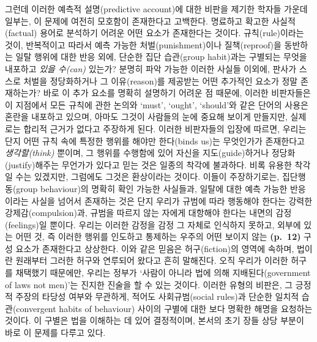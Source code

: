 \documentclass[12pt, oneside]{book}  %
\begin{document}
그런데 이러한 예측적 설명(predictive account)에 대한 비판을 제기한
학자들 가운데 일부는, 이 문제에 여전히 모호함이 존재한다고 고백한다.
명료하고 확고한 사실적(factual) 용어로 분석하기 어려운 어떤 요소가
존재한다는 것이다. 규칙(rule)이라는 것이, 반복적이고 따라서 예측 가능한
처벌(punishment)이나 질책(reproof)을 동반하는 일탈 행위에 대한 반응
외에, 단순한 집단 습관(group habit)과는 구별되는 무엇을 내포하고
\emph{있을 수(can)} 있는가? 분명히 파악 가능한 이러한 사실들 이외에,
판사가 스스로 처벌을 정당화하거나 그 이유(reason)를 제공받는 어떤
추가적인 요소가 정말 존재하는가? 바로 이 추가 요소를 명확히 설명하기
어려운 점 때문에, 이러한 비판자들은 이 지점에서 모든 규칙에 관한 논의와
`must', `ought', `should'와 같은 단어의 사용은 혼란을 내포하고 있으며,
아마도 그것이 사람들의 눈에 중요해 보이게 만들지만, 실제로는 합리적
근거가 없다고 주장하게 된다. 이러한 비판자들의 입장에 따르면, 우리는
단지 어떤 규칙 속에 특정한 행위를 해야만 한다(binds us)는 무엇인가가
존재한다고 \emph{생각할(think)} 뿐이며, 그 행위를 수행함에 있어 자신을
지도(guide)하거나 정당화(justify)해주는 무언가가 있다고 믿는 것은 일종의
착각에 불과하다. 비록 유용한 착각일 수는 있겠지만, 그럼에도 그것은
환상이라는 것이다. 이들이 주장하기로는, 집단행동(group behaviour)의
명확히 확인 가능한 사실들과, 일탈에 대한 예측 가능한 반응이라는 사실을
넘어서 존재하는 것은 단지 우리가 규범에 따라 행동해야 한다는 강력한
강제감(compulsion)과, 규범을 따르지 않는 자에게 대항해야 한다는 내면의
감정(feelings)일 뿐이다. 우리는 이러한 감정을 감정 그 자체로 인식하지
못하고, 외부에 있는 어떤 것, 즉 이러한 행위를 인도하고 통제하는 우주의
어떤 보이지 않는 \textbf{(p.~12)} 구성 요소가 존재한다고 상상한다. 이와
같은 믿음은 허구(fiction)의 영역에 속하며, 법이란 원래부터 그러한 허구와
연루되어 왔다고 흔히 말해진다. 오직 우리가 이러한 허구를 채택했기
때문에만, 우리는 정부가 `사람이 아니라 법에 의해 지배된다(government of
laws not men)'는 진지한 진술을 할 수 있는 것이다. 이러한 유형의 비판은,
그 긍정적 주장의 타당성 여부와 무관하게, 적어도 사회규범(social rules)과
단순한 일치적 습관(convergent habits of behaviour) 사이의 구별에 대한
보다 명확한 해명을 요청하는 것이다. 이 구별은 법을 이해하는 데 있어
결정적이며, 본서의 초기 장들 상당 부분이 바로 이 문제를 다루고 있다.
\end{document}
